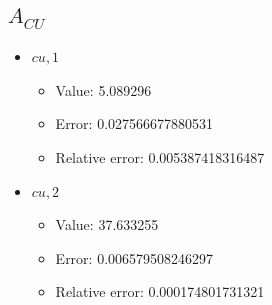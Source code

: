 \documentclass{article}%
\begin{document}
\subsection{$A_{CU}$}%
\begin{itemize}%
	\item $\textit{cu},1$%
	\begin{itemize}%
		\item Value: 5.089296%
		\item Error: 0.027566677880531%
		\item Relative error: 0.005387418316487%
	\end{itemize}%
	\item $\textit{cu},2$%
	\begin{itemize}%
		\item Value: 37.633255%
		\item Error: 0.006579508246297%
		\item Relative error: 0.000174801731321%
	\end{itemize}%
\end{itemize}%
\end{document}
